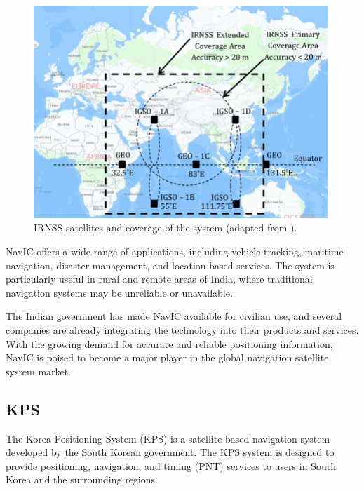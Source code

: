 \begin{figure}[!ht]
    \begin{center}
        \includegraphics[width=0.8\columnwidth]{figures/irnss}
        \caption{IRNSS satellites and coverage of the system (adapted from \cite{thombre2015}).}
        \label{fig:irnss}
    \end{center}
\end{figure}

NavIC offers a wide range of applications, including vehicle tracking, maritime navigation, disaster management, and location-based services. The system is particularly useful in rural and remote areas of India, where traditional navigation systems may be unreliable or unavailable.

The Indian government has made NavIC available for civilian use, and several companies are already integrating the technology into their products and services. With the growing demand for accurate and reliable positioning information, NavIC is poised to become a major player in the global navigation satellite system market.

\subsection{KPS}

The Korea Positioning System (KPS) \cite{choi2020} is a satellite-based navigation system developed by the South Korean government. The KPS system is designed to provide positioning, navigation, and timing (PNT) services to users in South Korea and the surrounding regions.


